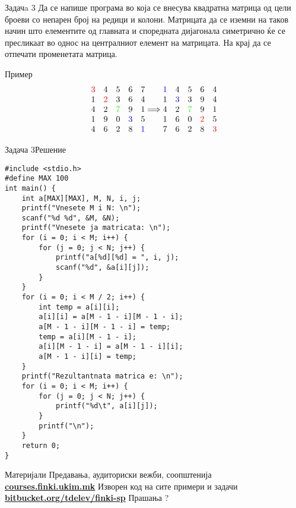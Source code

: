 \begin{frame}{Задачa 3}
Да се напише програма во која се внесува квадратна матрица од цели броеви со
непарен број на редици и колони. Матрицата да се иземни на таков начин што
елементите од главната и споредната дијагонала симетрично ќе се пресликаат во
однос на централниот елемент на матрицата. На крај да се отпечати променетата
матрица.
\begin{exampleblock}{Пример}
\[
 \begin{matrix}
 \color{red}{3} & 4 & 5 & 6 & 7\\ 
 1 & \color{red}{2} & 3 & 6 & 4\\
 4 & 2 & \color{green}{7} & 9 & 1\\
 1 & 9 & 0 & \color{blue}{3} & 5\\ 
 4 & 6 & 2 & 8 & \color{blue}{1}
 \end{matrix}
 \Longrightarrow
 \begin{matrix}
    \color{blue}{1} & 4 & 5 & 6 & 4\\ 
    1 & \color{blue}{3} & 3 & 9 & 4\\
    4 & 2 & \color{green}{7} & 9 & 1\\
    1 & 6 & 0 & \color{red}{2} & 5\\ 
    7 & 6 & 2 & 8 & \color{red}{3}
 \end{matrix}
\]
\end{exampleblock}
\end{frame}

\begin{frame}[fragile,shrink=5]{Задача 3}{Решение}
\begin{lstlisting}
#include <stdio.h>
#define MAX 100
int main() {
    int a[MAX][MAX], M, N, i, j;
    printf("Vnesete M i N: \n");
    scanf("%d %d", &M, &N);
    printf("Vnesete ja matricata: \n");
    for (i = 0; i < M; i++) {
        for (j = 0; j < N; j++) {
            printf("a[%d][%d] = ", i, j);
            scanf("%d", &a[i][j]);
        }
    }
    for (i = 0; i < M / 2; i++) {
        int temp = a[i][i];
        a[i][i] = a[M - 1 - i][M - 1 - i];
        a[M - 1 - i][M - 1 - i] = temp;
        temp = a[i][M - 1 - i];
        a[i][M - 1 - i] = a[M - 1 - i][i];
        a[M - 1 - i][i] = temp;
    }
    printf("Rezultantnata matrica e: \n");
    for (i = 0; i < M; i++) {
        for (j = 0; j < N; j++) {
            printf("%d\t", a[i][j]);
        }
        printf("\n");
    }
    return 0;
}
\end{lstlisting}
\end{frame}

\begin{frame}{Материјали}{}
	Предавања, аудиториски вежби, соопштенија\\
	\href{http://courses.finki.ukim.mk/}{\textbf{courses.finki.ukim.mk}}
	\vfill
	Изворен код на сите примери и задачи\\
	\href{http://bitbucket.org/tdelev/finki-sp/}{\textbf{bitbucket.org/tdelev/finki-sp}}
	\vfill
	{\Huge Прашања ?}
\end{frame}
